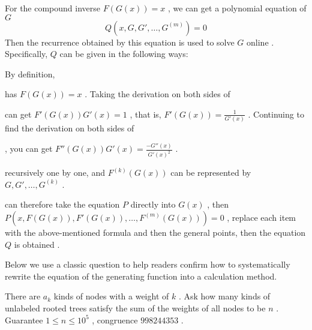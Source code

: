For the compound inverse $ F(G(x)) = x $ , we can get a polynomial equation of $ G $
$$ Q(x,G,G', \dots ,G^{(m)}) = 0 $$
Then the recurrence obtained by this equation is used to solve $ G $ online . Specifically, $ Q $ can be given in the following ways:
\begin { enumerate }
  By definition, \item has $ F(G(x))=x $ .
  Taking the derivation on both sides of \item can get $ F'(G(x))G'(x) = 1 $ , that is, $ F'(G(x)) = \frac  1 {G'(x)} $ .
  Continuing to find the derivation on both sides of \item , you can get $ F''(G(x))G'(x) = \frac {-G''(x)}{G'(x)^2} $ .
  \item recursively one by one, and $ F^{(k)}(G(x)) $ can be represented by $ G,G', \dots ,G^{(k)} $ .
  \item can therefore take the equation $ P $ directly into $ G(x) $ , then $ P(x,F(G(x)),F'(G(x)), \dots ,F^{( m)}(G(x))) = 0 $ , replace each item with the above-mentioned formula and then the general points, then the equation $ Q $ is obtained .
\end { enumerate }

Below we use a classic question to help readers confirm how to systematically rewrite the equation of the generating function into a calculation method.

\begin { problem }
There are $ a_k $ kinds of nodes with a weight of $ k $ . Ask how many kinds of unlabeled rooted trees satisfy the sum of the weights of all nodes to be $ n $ . Guarantee $ 1 \le n \le 10 ^ 5 $ , congruence $ 998244353 $ . 
\end { problem }

